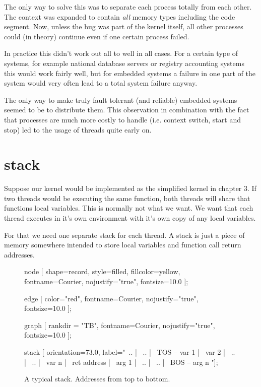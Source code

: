 			The only way to solve this was to separate each process totally from each other. The context was expanded to contain \textit{all} memory types including the code segment. Now, unless the bug was part of the kernel itself, all other processes could (in theory) continue even if one certain process failed.

			In practice this didn't work out all to well in all cases. For a certain type of systems, for example national database servers or registry accounting systems this would work fairly well, but for embedded systems a failure in one part of the system would very often lead to a total system failure anyway.

			The only way to make truly fault tolerant (and reliable) embedded systems seemed to be to distribute them. This observation in combination with the fact that processes are much more costly to handle (i.e. context switch, start and stop) led to the usage of threads quite early on.\\

			\par

	\section{stack}
		Suppose our kernel would be implemented as the simplified kernel in chapter 3. If two threads would be executing the same function, both threads will share that functions local variables. This is normally not what we want. We want that each thread executes in it's own environment with it's own copy of any local variables.

		For that we need one separate stack for each thread. A stack is just a piece of memory somewhere intended to store local variables and function call return addresses.
		\begin{figure}
		\begin{dotpic}
			node [
				shape=record,
				style=filled,
				fillcolor=yellow,
				fontname=Courier,
				nojustify="true",
				fontsize=10.0
			];

			edge [
				color="red",
				fontname=Courier,
				nojustify="true",
				fontsize=10.0
			];

			graph [
				rankdir = "TB",
				fontname=Courier,
				nojustify="true",
				fontsize=10.0
			];

			stack [ orientation=73.0, label="{\
				..  | \
				..  | \
				TOS --\> var 1         | \
				var 2   | \
				..  | \
				..  | \
				var n  | \
				ret address | \
				arg 1   | \
				..  | \
				..  | \
				BOS --\> arg n }"];
		\end{dotpic}
		\caption{A typical stack. Addresses from top to bottom.\label{stk1}}
		\end{figure}

